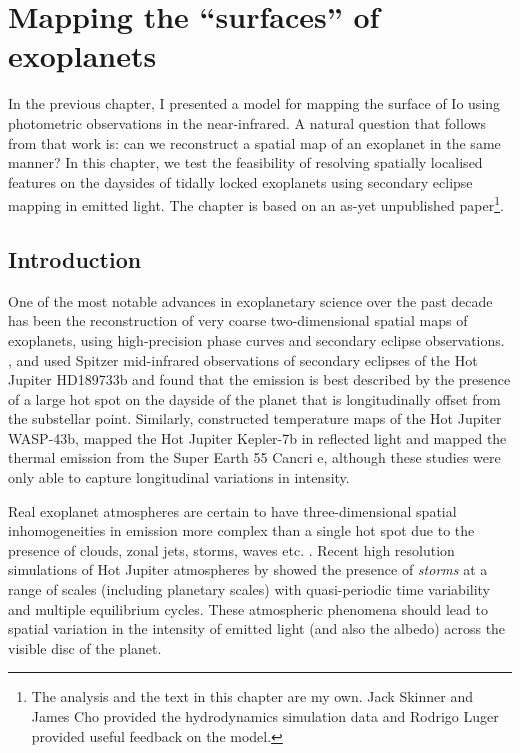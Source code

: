 \documentclass[12pt,dvipsnames]{report}
\begin{document}
\chapter{Mapping the ``surfaces'' of exoplanets}
\label{ch:mapping_exoplanets}
In the previous chapter, I presented a model for mapping the surface of Io using 
photometric observations in the near-infrared. A natural question that follows from 
that work is: can we reconstruct a spatial map of an exoplanet in the same manner? 
In this chapter, we test the feasibility of resolving spatially localised features 
on the daysides of tidally locked exoplanets using secondary eclipse mapping in 
emitted light. The chapter is based on an as-yet unpublished paper\footnote{The
analysis and the text in this chapter are my own. Jack Skinner and James Cho provided 
the hydrodynamics simulation data and Rodrigo Luger provided useful feedback on the 
model.}.


\section{Introduction}
\label{sec:introduction}
One of the most notable advances in exoplanetary science over the past decade has been the 
reconstruction of very coarse two-dimensional spatial maps of exoplanets, using high-precision phase
curves and secondary eclipse observations. 
\citet{2007Natur.447..183K}, \citet{2012ApJ...747L..20M} and \citet{2012A&A...548A.128D} 
used Spitzer mid-infrared observations of secondary eclipses of the Hot Jupiter HD189733b 
and found that the emission is best described by the presence of a large hot spot on the 
dayside of the planet that is longitudinally offset from the substellar point.  
Similarly, \citet{2014Sci...346..838S} constructed temperature 
maps of the Hot Jupiter WASP-43b, \citet{2013ApJ...776L..25D} mapped the Hot Jupiter 
Kepler-7b in reflected light and \citet{2016Natur.532..207D} mapped the thermal emission 
from the Super Earth 55 Cancri e, although these studies were only able to capture 
longitudinal variations in intensity. 


Real exoplanet atmospheres are certain to have three-dimensional spatial
inhomogeneities in emission more complex than a single hot spot due to the
presence of clouds, zonal jets, storms, waves etc. \citep{2020SSRv..216..139S}. Recent
high resolution simulations of Hot Jupiter atmospheres by \citet{2021ApJ...913L..32C} 
showed the presence of \emph{storms} at
a range of scales (including planetary scales) with quasi-periodic time
variability and multiple equilibrium cycles. These atmospheric phenomena should
lead to spatial variation in the intensity of emitted light (and also the albedo) across 
the visible disc of the planet.
\end{document}
